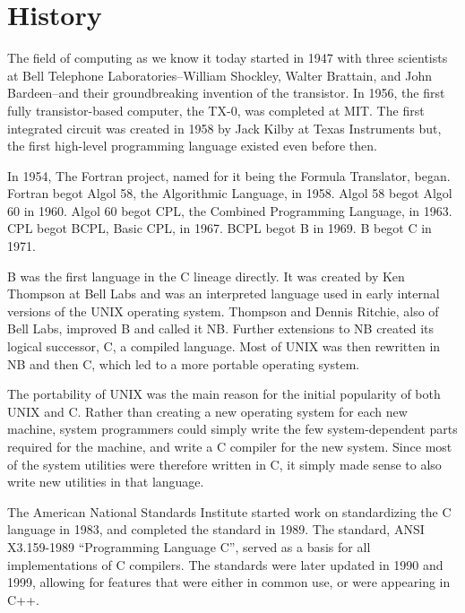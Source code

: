 \section{History}
The field of computing as we know it today started in 1947 with three
scientists at Bell Telephone Laboratories--William Shockley, Walter Brattain,
and John Bardeen--and their groundbreaking invention of the transistor. In
1956, the first fully transistor-based computer, the TX-0, was completed at
MIT. The first integrated circuit was created in 1958 by Jack Kilby at Texas
Instruments but, the first high-level programming language existed even before
then.

In 1954, The Fortran project, named for it being the Formula Translator, began.
Fortran begot Algol 58, the Algorithmic Language, in 1958. Algol 58 begot Algol
60 in 1960. Algol 60 begot CPL, the Combined Programming Language, in 1963. CPL
begot BCPL, Basic CPL, in 1967. BCPL begot B in 1969. B begot C in 1971.

B was the first language in the C lineage directly. It was created by Ken
Thompson at Bell Labs and was an interpreted language used in early internal
versions of the UNIX operating system.  Thompson and Dennis Ritchie, also of
Bell Labs, improved B and called it NB. Further extensions to NB created its
logical successor, C, a compiled language. Most of UNIX was then rewritten in
NB and then C, which led to a more portable operating system.

The portability of UNIX was the main reason for the initial popularity of both
UNIX and C. Rather than creating a new operating system for each new machine,
system programmers could simply write the few system-dependent parts required
for the machine, and write a C compiler for the new system. Since most of the
system utilities were therefore written in C, it simply made sense to also
write new utilities in that language.

The American National Standards Institute started work on standardizing the C
language in 1983, and completed the standard in 1989. The standard, ANSI
X3.159-1989 ``Programming Language C'', served as a basis for all
implementations of C compilers. The standards were later updated in 1990 and
1999, allowing for features that were either in common use, or were appearing
in C++. 
